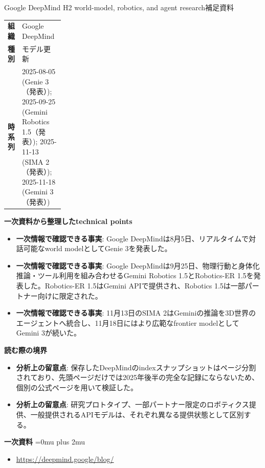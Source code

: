 \begin{technicalnote}{Google DeepMind H2 world-model, robotics, and agent research}{補足資料}
\begingroup
\begin{tabularx}{\linewidth}{@{}>{\bfseries}p{0.22\linewidth}X@{}}
組織 & Google DeepMind \\
種別 & モデル更新 \\
時系列 & 2025-08-05 (Genie 3（発表）); 2025-09-25 (Gemini Robotics 1.5（発表）); 2025-11-13 (SIMA 2（発表）); 2025-11-18 (Gemini 3（発表）) \\
\end{tabularx}
\smallskip
{\bfseries 一次資料から整理したtechnical points}
\begin{itemize}[leftmargin=1.5em,itemsep=0.35em]
\item \textbf{一次情報で確認できる事実}: Google DeepMindは8月5日、リアルタイムで対話可能なworld modelとしてGenie 3を発表した。
\item \textbf{一次情報で確認できる事実}: Google DeepMindは9月25日、物理行動と身体化推論・ツール利用を組み合わせるGemini Robotics 1.5とRobotics-ER 1.5を発表した。Robotics-ER 1.5はGemini APIで提供され、Robotics 1.5は一部パートナー向けに限定された。
\item \textbf{一次情報で確認できる事実}: 11月13日のSIMA 2はGeminiの推論を3D世界のエージェントへ統合し、11月18日にはより広範なfrontier modelとしてGemini 3が続いた。
\end{itemize}
\begin{minipage}{\linewidth}
{\bfseries 読む際の境界}
\begin{itemize}[leftmargin=1.5em,itemsep=0.35em]
\item \textbf{分析上の留意点}: 保存したDeepMindのindexスナップショットはページ分割されており、先頭ページだけでは2025年後半の完全な記録にならないため、個別の公式ページを用いて検証した。
\item \textbf{分析上の留意点}: 研究プロトタイプ、一部パートナー限定のロボティクス提供、一般提供されるAPIモデルは、それぞれ異なる提供状態として区別する。
\end{itemize}
\begin{samepage}
{\bfseries 一次資料}
\begingroup\sloppy
\Urlmuskip=0mu plus 2mu\relax
\begin{itemize}[leftmargin=1.5em,itemsep=0.25em]
\item {\scriptsize\url{https://deepmind.google/blog/}}
\end{itemize}
\endgroup
\end{samepage}
\end{minipage}
\endgroup
\end{technicalnote}
\medskip

